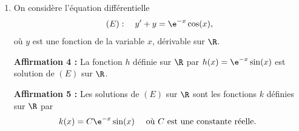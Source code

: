 \begin{enumerate}
	\textbf{Affirmation 3:} \quad $P_{B}\big(\,\overline{A}\,\big)=\dfrac{9}{50}$.

	\item On considère l'équation différentielle
	\[(E): \quad y'+y=\e^{-x} \cos (x),\]
	où $y$ est une fonction de la variable $x$, dérivable sur $\R$.

	\textbf{Affirmation 4 :} La fonction $h$ définie sur $\R$ par $h(x)=\e^{-x} \sin (x)$ est solution de $(E)$ sur $\R$.

	\textbf{Affirmation 5 :} Les solutions de $(E)$ sur $\R$ sont les fonctions $k$ définies sur $\R$ par
	\[k(x)=C \e^{-x} \sin (x) \quad\text { où } C \text { est une constante réelle. }\]
\end{enumerate}
